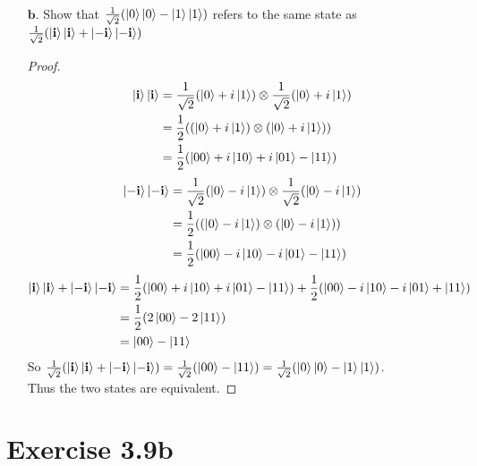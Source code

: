 \documentclass[11pt]{article}
\def\haf{\frac{1}{2}}
\def\bfi{\ensuremath\textbf{i}}
\def\srtt{\ensuremath\frac{1}{\sqrt{2}}}
\begin{document}
\begin{itemize}
\item[$\textbf{b.}$] Show that $\srtt(\ket{0}\ket{0} - \ket{1}\ket{1})$
        refers to the same state as
        $\srtt(\ket{\bfi}\ket{\bfi} + \ket{-\bfi}\ket{-\bfi})$
    \begin{proof}
        \begin{align*}
        \ket{\bfi}\ket{\bfi} 
            &= \srtt(\ket{0} + i\ket{1}) \otimes \srtt(\ket{0} + i\ket{1}) \\
            &= \haf((\ket{0} + i\ket{1}) \otimes (\ket{0} + i\ket{1})) \\
            &= \haf(\ket{00} + i\ket{10} + i\ket{01} - \ket{11})  %
        \end{align*}
        \begin{align*}
        \ket{-\bfi}\ket{-\bfi} 
            &= \srtt(\ket{0} - i\ket{1}) \otimes \srtt(\ket{0} - i\ket{1}) \\ 
            &= \haf((\ket{0} - i\ket{1}) \otimes (\ket{0} - i\ket{1})) \\ 
            &= \haf(\ket{00} - i\ket{10} - i\ket{01} - \ket{11}) %
        \end{align*}
        \begin{align*}
        \ket{\bfi}\ket{\bfi} + \ket{-\bfi}\ket{-\bfi} 
            &= \haf(\ket{00} + i\ket{10} + i\ket{01} - \ket{11}) + \haf(\ket{00} - i\ket{10} - i\ket{01} + \ket{11}) \\
            &= \haf(2\ket{00} - 2\ket{11})   \\
            &= \ket{00} - \ket{11}
        \end{align*}
        So $\srtt(\ket{\bfi}\ket{\bfi} + \ket{-\bfi}\ket{-\bfi}) = \srtt(\ket{00} - \ket{11}) = \srtt(\ket{0}\ket{0} - \ket{1}\ket{1})$. \\
        Thus the two states are equivalent.
    \end{proof}
\end{itemize}

\newpage
\section*{Exercise 3.9b}
\end{document}
